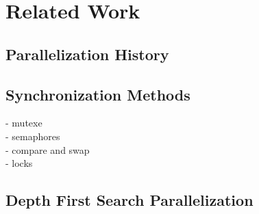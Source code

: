 \chapter{Related Work}

\section{Parallelization History}
\section{Synchronization Methods}
- mutexe\\
- semaphores\\
- compare and swap\\
- locks\\
\section{Depth First Search Parallelization}